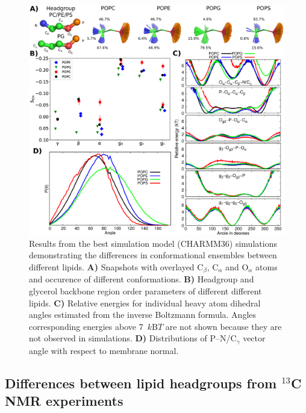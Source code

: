 \documentclass[aps,prl,superscriptaddress,twocolumn]{revtex4}
\begin{document}
\begin{figure}[bt]
  \centering
   \includegraphics[width=18.0cm]{./Figs/figure2.eps}
   \caption{\label{structures}
     Results from the best simulation model (CHARMM36) simulations demonstrating the differences in conformational ensembles between different lipids. 
     \textbf{A)} Snapshots with overlayed C$_\beta$, C$_\alpha$ and O$_\alpha$ atoms and occurence of different conformations.
     \textbf{B)} Headgroup and glycerol backbone region order parameters of different different lipids.
     \textbf{C)} Relative energies for individual heavy atom dihedral angles estimated from the inverse Boltzmann formula.
     Angles corresponding energies above 7~$k\mathrm{B}T$ are not shown because they are not observed in simulations.
     \textbf{D)} Distributions of P--N/C$_\gamma$ vector angle with respect to membrane normal.
  }
\end{figure}


\subsection{Differences between lipid headgroups from $^{13}$C NMR experiments}
\end{document}
